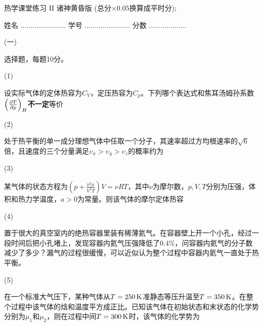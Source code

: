\documentclass[12pt,CJK]{article}
\begin{document}
\bch
{\large 热学课堂练习 II 诸神黄昏版 (总分$\times 0.05$换算成平时分);}


姓名 ....................... {\hskip 0.5in}    学号 .......................{\hskip 0.5in}  分数 ...................

\bitem

\item[(一)]{选择题，每题10分。

  \bitem

\item[(1)]{设实际气体的定体热容为$C_V$，定压热容为$C_p$。下列哪个表达式和焦耳汤姆孙系数$\left(\frac{\partial T}{\partial p}\right)_{H}${\bf 不一定}等价 \bropt
  
}
  
\item[(2)]{处于热平衡的单一成分理想气体中任取一个分子，其速率超过方均根速率的$\sqrt{6}$倍，且速度的三个分量满足$\upsilon_x>\upsilon_y>\upsilon_z$的概率约为 \bropt
  

}    
\item[(3)]{某气体的状态方程为$\left(p+\frac{\nu^2 a}{V^2T}\right)V = \nu R T$，其中$\nu$为摩尔数，$p, V, T$分别为压强，体积和热力学温度，$a>0$为常量。则该气体的摩尔定体热容 \bropt
  

}


\item[(4)]{  置于很大的真空室内的绝热容器里装有稀薄氦气。在容器壁上开一个小孔，经过一段时间后把小孔堵上，发现容器内氦气压强降低了$0.4\%$，问容器内氦气的分子数减少了多少？漏气的过程很缓慢，可以近似认为整个过程中容器内氦气一直处于热平衡。 \bropt

}

\item[(5)]{在一个标准大气压下，某种气体从$T=250\,\mathrm{K}$准静态等压升温至$T=350\,\mathrm{K}$。在整个过程中该气体的焓和温度平方成正比。已知该气体在初始状态和末状态的化学势分别为$\mu_1$和$\mu_2$，则在过程中间$T=300\,\mathrm{K}$时，该气体的化学势为 \bropt
  
}
  
  \eitem
}
\end{document}
